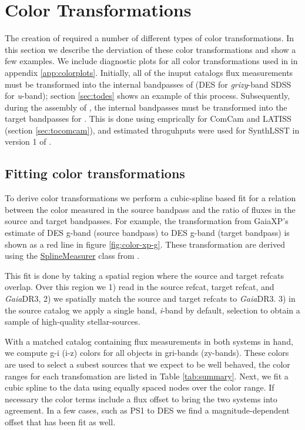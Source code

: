 \section{Color Transformations}
\label{sec:colors}
The creation of \monster required a number of different types of color transformations. 
In this section we describe the derviation of these color transformations and show a few examples. 
We include diagnostic plots for all color transformations used in \monster in appendix \ref{app:colorplots}. 
Initially, all of the inuput catalogs flux measurements must be transformed into the internal bandpasses of \monster (DES for \emph{grizy}-band SDSS for \emph{u}-band); section \ref{sec:todes} shows an example of this process. 
Subsequently, during the assembly of \monster, the internal bandpasses must be transformed into the target bandpasses for \monster. 
This is done using emprically for ComCam and LATISS (section \ref{sec:tocomcam}), and estimated throguhputs were used for SynthLSST in version 1 of \monster. 


\subsection{Fitting color transformations}
To derive color transformations we perform a cubic-spline based fit for a relation between the color measured in the source bandpass and the ratio of fluxes in the source and target bandpasses.
For example, the transformation from GaiaXP's estimate of DES g-band (source bandpass) to DES g-band (target bandpass) is shown as a red line in figure \ref{fig:color-xp-g}. 
These transformation are derived using the \href{https://github.com/lsst-dm/the_monster/blob/main/python/lsst/the/monster/measure_colorterms.py}{SplineMeasurer} class from \monster. 

This fit is done by taking a spatial region where the source and target refcats overlap. 
Over this region we 1) read in the source refcat, target refcat, and \emph{Gaia}DR3, 2) we spatially match the source and target refcats to \emph{Gaia}DR3. 3) in the source catalog we apply a single band, \textit{i}-band by default, selection to obtain a sample of high-quality stellar-sources.  

With a matched catalog containing flux measurements in both systems in hand, we compute g-i (i-z) colors for all objects in gri-bands (zy-bands). 
These colors are used to select a subest sources that we expect to be well behaved, the color ranges for each transfomation are listed in Table \ref{tab:summary}.
Next, we fit a cubic spline to the data using equally spaced nodes over the color range.
If necessary the color terms include a flux offset to bring the two systems into agreement. 
In a few cases, such as PS1 to DES we find a magnitude-dependent offset that has been fit as well.

